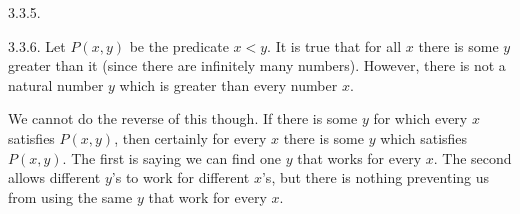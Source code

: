\begin {itemize}
\begin{ans}{3.3.5.}
	
\end{ans}
\begin{ans}{3.3.6.}
		Let $P(x,y)$ be the predicate $x < y$.  It is true that for all $x$ there is some $y$ greater than it (since there are infinitely many numbers).  However, there is not a natural number $y$ which is greater than every number $x$.

		We cannot do the reverse of this though.  If there is some $y$ for which every $x$ satisfies $P(x,y)$, then certainly for every $x$ there is some $y$ which satisfies $P(x,y)$.  The first is saying we can find one $y$ that works for every $x$.  The second allows different $y$'s to work for different $x$'s, but there is nothing preventing us from using the same $y$ that work for every $x$.
	
\end{ans}
\protect \end {itemize}
